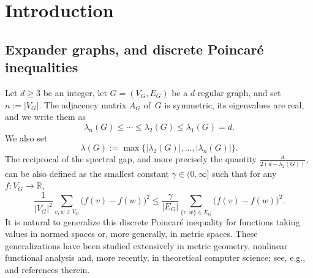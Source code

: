 \documentclass[11pt,leqno]{amsart}
\theoremstyle{remark}
\theoremstyle{plain}
\begin{document}
\tableofcontents


\section{Introduction} \label{sec1}

\subsection{Expander graphs, and discrete Poincar\'{e} inequalities}

Let $d\geqslant 3$ be an integer, let $G=(V_G,E_G)$ be a $d\text{-regular}$ graph, and set $n:=|V_G|$.
The adjacency matrix $A_G$ of\, $G$ is symmetric, its eigenvalues are real, and we write them as
\begin{equation} \label{eq-eigen1}
\lambda_n(G) \leqslant \cdots \leqslant \lambda_2(G) \leqslant \lambda_1(G)=d.
\end{equation}
We also set
\begin{equation} \label{eq-eigen2}
\lambda(G):=\max\big\{ |\lambda_2(G)|,\dots, |\lambda_n(G)|\big\}.
\end{equation}
The reciprocal of the spectral gap, and more precisely the quantity $\frac{d}{2(d-\lambda_2(G))}$, can be also defined as the
smallest constant $\gamma\in (0,\infty]$ such that for any $f\colon V_G\to \mathbb{R}$,
\begin{equation} \label{poincare-real}
\frac{1}{|V_G|^2} \sum_{v,w\in V_G} \big(f(v)-f(w)\big)^2 \leqslant \frac{\gamma}{|E_G|}
\sum_{\{v,w\}\in E_G} \big(f(v)-f(w)\big)^2.
\end{equation}
It is natural to generalize this discrete Poincar\'{e} inequality for functions taking values in normed spaces or, more generally,
in metric spaces. These generalizations have been studied extensively in metric geometry, nonlinear functional analysis
and, more recently, in theoretical computer science; see, e.g., \cite{ANNRW18a,Es22,Gr03,Ma97,MN14,MN15,Pi10} and
references therein.
\end{document}
